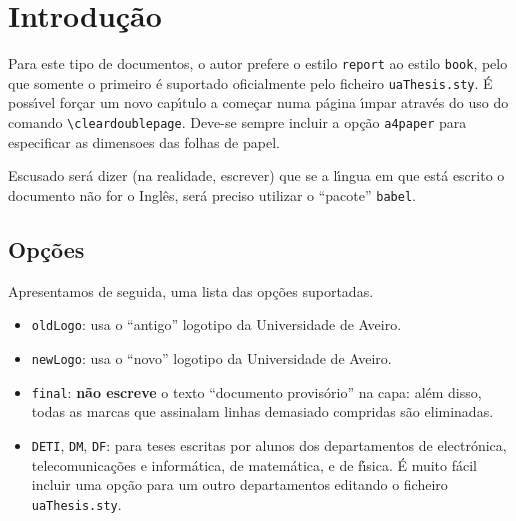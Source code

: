 \documentclass[11pt,twoside,a4paper]{report}
\begin{document}
%
%

\tableofcontents

\cleardoublepage
\listoffigures

\cleardoublepage
\listoftables



\cleardoublepage
{}
\chapter{Introdu\c c\~ao}

Para este tipo de documentos, o autor prefere o estilo \verb+report+ ao estilo \verb-book-,
pelo que somente o primeiro \'e suportado oficialmente pelo ficheiro \verb:uaThesis.sty:.
\'E poss\'\i vel for\c car um novo cap\'\i tulo a come\c car numa p\'agina \'\i mpar atrav\'es
do uso do comando \verb!\cleardoublepage!. Deve-se sempre incluir a op\c c\~ao \verb+a4paper+
para especificar as dimensoes das folhas de papel.

Escusado ser\'a dizer (na realidade, escrever) que se a l\'\i ngua em que est\'a escrito o
documento n\~ao for o Ingl\^es, ser\'a preciso utilizar o ``pacote'' \verb.babel..


\section{Op\c c\~oes}

Apresentamos de seguida, uma lista das op\c c\~oes suportadas.
\begin{itemize}
  \item \verb+oldLogo+: usa o ``antigo'' logotipo da Universidade de Aveiro.
  \item \verb+newLogo+: usa o ``novo'' logotipo da Universidade de Aveiro.
  \item \verb+final+: \textbf{n\~ao escreve} o texto ``documento provis\'orio'' na capa: al\'em
        disso, todas as marcas que assinalam linhas demasiado compridas s\~ao eliminadas.
  \item \verb+DETI+, \verb+DM+, \verb+DF+: para teses escritas por alunos dos departamentos de
        electr\'onica, telecomunica\c c\~oes e inform\'atica, de matem\'atica, e de f\'\i sica.
        \'E muito f\'acil incluir uma op\c c\~ao para um outro departamentos editando o
        ficheiro \verb+uaThesis.sty+.
\end{itemize}
\end{document}
